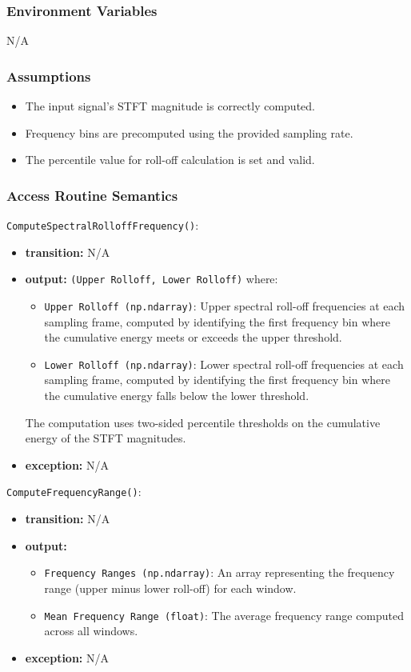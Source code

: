 \documentclass[12pt, titlepage]{article}
\begin{document}
{\subsubsection{Environment Variables}
N/A

\subsubsection{Assumptions}
\begin{itemize}
    \item The input signal's STFT magnitude is correctly computed.
    \item Frequency bins are precomputed using the provided sampling rate.
    \item The percentile value for roll-off calculation is set and valid.
\end{itemize}

\subsubsection{Access Routine Semantics}

\noindent \texttt{ComputeSpectralRolloffFrequency()}:
\begin{itemize}
    \item \textbf{transition:} N/A
    \item \textbf{output:} \texttt{(Upper Rolloff, Lower Rolloff)} where:
    \begin{itemize}
        \item \texttt{Upper Rolloff (np.ndarray)}: Upper spectral roll-off frequencies at each sampling frame, computed by identifying the first frequency bin where the cumulative energy meets or exceeds the upper threshold.
        \item \texttt{Lower Rolloff (np.ndarray)}: Lower spectral roll-off frequencies at each sampling frame, computed by identifying the first frequency bin where the cumulative energy falls below the lower threshold.
    \end{itemize}
    The computation uses two-sided percentile thresholds on the cumulative energy of the STFT magnitudes.
    \item \textbf{exception:} N/A
\end{itemize}

\noindent \texttt{ComputeFrequencyRange()}:
\begin{itemize}
    \item \textbf{transition:} N/A
    \item \textbf{output:}
    \begin{itemize}
        \item \texttt{Frequency Ranges (np.ndarray)}: An array representing the frequency range (upper minus lower roll-off) for each window.
        \item \texttt{Mean Frequency Range (float)}: The average frequency range computed across all windows.
    \end{itemize}
    \item \textbf{exception:} N/A
\end{itemize}

}
\end{document}
